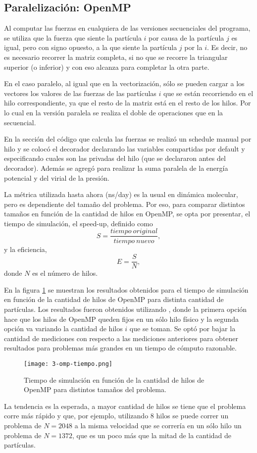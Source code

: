 \documentclass[a4paper,spanish,12pt,twoside]{article}
\begin{document}
\subsection{Paralelización: OpenMP}

Al computar las fuerzas en cualquiera de las versiones secuenciales del programa, se utiliza que la fuerza que siente la partícula $i$ por causa de la partícula $j$ es igual, pero con signo opuesto, a la que siente la partícula $j$ por la $i$. Es decir, no es necesario recorrer la matriz completa, si no que se recorre la triangular superior (o inferior) y con eso alcanza para completar la otra parte.

En el caso paralelo, al igual que en la vectorización, sólo se pueden cargar a los vectores los valores de las fuerzas de las partículas $i$ que se están recorriendo en el hilo correspondiente, ya que el resto de la matriz está en el resto de los hilos. Por lo cual en la versión paralela se realiza el doble de operaciones que en la secuencial.

En la sección del código que calcula las fuerzas se realizó un schedule manual por hilo y se colocó el decorador  declarando las variables compartidas por default y especificando cuales son las privadas del hilo (que se declararon antes del decorador). Además se agregó  para realizar la suma paralela de la energía potencial y del virial de la presión.

La métrica utilizada hasta ahora (ns/day) es la usual en dinámica molecular, pero es dependiente del tamaño del problema. Por eso, para comparar distintos tamaños en función de la cantidad de hilos en OpenMP, se opta por presentar, el tiempo de simulación, el speed-up, definido como
$$
S = \frac{tiempo\ original}{tiempo\ nuevo},
$$
y la eficiencia,
$$
E = \frac{S}{N},
$$
donde $N$ es el número de hilos.

En la figura \ref{fig:omp-tiempo} se muestran los resultados obtenidos para el tiempo de simulación en función de la cantidad de hilos de OpenMP para distinta cantidad de partículas. Los resultados fueron obtenidos utilizando , donde la primera opción hace que los hilos de OpenMP queden fijos en un sólo hilo físico y la segunda opción va variando la cantidad de hilos $i$ que se toman. Se optó por bajar la cantidad de mediciones con respecto a las mediciones anteriores para obtener resultados para problemas más grandes en un tiempo de cómputo razonable.
\begin{figure}[h]
	\centering
	\texttt{[image: 3-omp-tiempo.png]}
	\caption{Tiempo de simulación en función de la cantidad de hilos de OpenMP para distintos tamaños del problema.}\label{fig:omp-tiempo}
\end{figure}
La tendencia es la esperada, a mayor cantidad de hilos se tiene que el problema corre más rápido y que, por ejemplo, utilizando 8 hilos se puede correr un problema de $N = 2048$ a la misma velocidad que se correría en un sólo hilo un problema de $N = 1372$, que es un poco más que la mitad de la cantidad de partículas.
\end{document}
